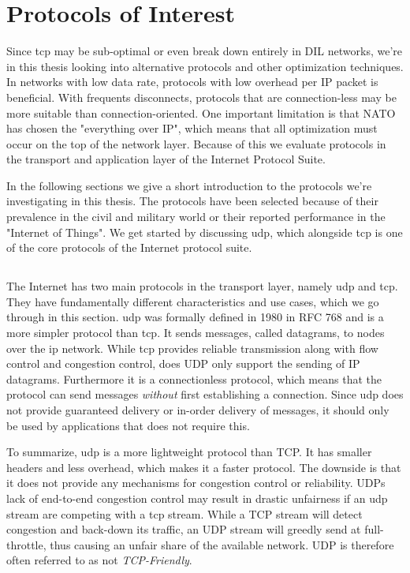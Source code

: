 \section{Protocols of Interest}

Since \gls{tcp} may be sub-optimal or even break down entirely in DIL networks,
we're in this thesis looking into alternative protocols and other optimization
techniques. In networks with low data rate, protocols with low overhead per IP
packet is beneficial. With frequents disconnects, protocols that are
connection-less may be more suitable than connection-oriented. One important
limitation is that NATO has chosen the "everything over IP", which means that
all optimization must occur on the top of the network layer. Because of this we
evaluate protocols in the transport and application layer of the Internet
Protocol Suite.

In the following sections we give a short introduction to the protocols
we're investigating in this thesis. The protocols have been selected because of
their prevalence in the civil and military world or their reported performance
in the "Internet of Things". We get started by discussing \gls{udp}, which
alongside \gls{tcp} is one of the core protocols of the Internet protocol suite.


\subsection{}

The Internet has two main protocols in the transport layer, namely \gls{udp} and
\gls{tcp}. They have fundamentally different characteristics and use cases,
which we go through in this section. \gls{udp} was formally defined in 1980 in
RFC 768\cite{rfc-udp} and is a more simpler protocol than \gls{tcp}. It sends
messages, called datagrams, to nodes over the \gls{ip} network. While \gls{tcp}
provides reliable transmission along with flow control and congestion control,
does UDP only support the sending of IP datagrams. Furthermore it is a
connectionless protocol, which means that the protocol can send messages
\textit{without} first establishing a connection. Since \gls{udp} does not
provide guaranteed delivery or in-order delivery of messages, it should only be
used by applications that does not require this.

To summarize, \gls{udp} is a more lightweight protocol than TCP. It has smaller
headers and less overhead, which makes it a faster protocol. The downside is
that it does not provide any mechanisms for congestion control or reliability.
UDPs lack of end-to-end congestion control may result in drastic unfairness if
an \gls{udp} stream are competing with a \gls{tcp}
stream\cite{floyd-congestion}. While a TCP stream will detect congestion and
back-down its traffic, an UDP stream will greedly send at full-throttle, thus
causing an unfair share of the available network. UDP is therefore often
referred to as not \textit{TCP-Friendly}.

